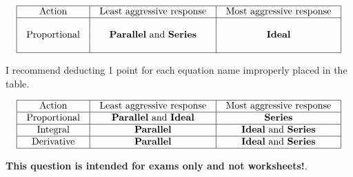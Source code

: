 
$$\vbox{\offinterlineskip
\halign{\strut
\vrule \quad\hfil # \ \hfil & 
\vrule \quad\hfil # \ \hfil & 
\vrule \quad\hfil # \ \hfil \vrule \cr
\noalign{\hrule}
%
Action & Least aggressive response & Most aggressive response \cr
%
\noalign{\hrule}
%
 &  &  \cr
Proportional & {\bf Parallel} and {\bf Series} & {\bf Ideal} \cr
 &  &  \cr
%
\noalign{\hrule}
} %
}$$ %








I recommend deducting 1 point for each equation name improperly placed in the table.


$$\vbox{\offinterlineskip
\halign{\strut
\vrule \quad\hfil # \ \hfil & 
\vrule \quad\hfil # \ \hfil & 
\vrule \quad\hfil # \ \hfil \vrule \cr
\noalign{\hrule}
%
Action & Least aggressive response & Most aggressive response \cr
%
\noalign{\hrule}
%
Proportional & {\bf Parallel} and {\bf Ideal} & {\bf Series} \cr
%
\noalign{\hrule}
%
Integral & {\bf Parallel} & {\bf Ideal} and {\bf Series} \cr
%
\noalign{\hrule}
%
Derivative & {\bf Parallel} & {\bf Ideal} and {\bf Series} \cr
%
\noalign{\hrule}
} %
}$$ %







{\bf This question is intended for exams only and not worksheets!}.



